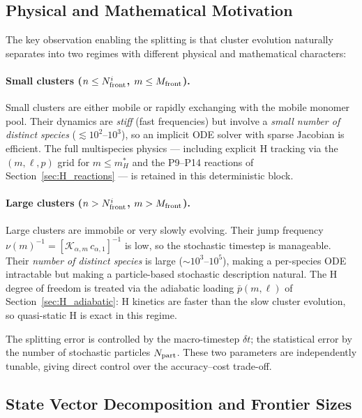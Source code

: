 \subsection{Physical and Mathematical Motivation}
\label{sec:hybrid_motivation}

The key observation enabling the splitting is that cluster evolution
naturally separates into two regimes with different physical and
mathematical characters:

\paragraph{Small clusters ($n \leq N_{\rm front}^i$,
$m \leq M_{\rm front}$).}
Small clusters are either mobile or rapidly exchanging with the
mobile monomer pool.  Their dynamics are \emph{stiff} (fast
frequencies) but involve a \emph{small number of distinct species}
($\lesssim 10^2$--$10^3$), so an implicit ODE solver with sparse
Jacobian is efficient.  The full multispecies physics --- including
explicit H tracking via the $(m,\ell,p)$ grid for $m \leq m_H^*$
and the P9--P14 reactions of Section~\ref{sec:H_reactions} --- is
retained in this deterministic block.

\paragraph{Large clusters ($n > N_{\rm front}^i$,
$m > M_{\rm front}$).}
Large clusters are immobile or very slowly evolving.  Their jump
frequency $\nu(m)^{-1} = [\mathcal{K}_{\alpha,m}\,c_{\alpha,1}]^{-1}$
is low, so the stochastic timestep is manageable.  Their
\emph{number of distinct species} is large ($\sim 10^3$--$10^5$),
making a per-species ODE intractable but making a particle-based
stochastic description natural.  The H degree of freedom is treated
via the adiabatic loading $\bar{p}(m,\ell)$ of
Section~\ref{sec:H_adiabatic}: H kinetics are faster than the slow
cluster evolution, so quasi-static H is exact in this regime.

The splitting error is controlled by the macro-timestep $\delta t$;
the statistical error by the number of stochastic particles
$N_{\rm part}$.  These two parameters are independently tunable,
giving direct control over the accuracy--cost trade-off.

\subsection{State Vector Decomposition and Frontier Sizes}
\label{sec:hybrid_state}


